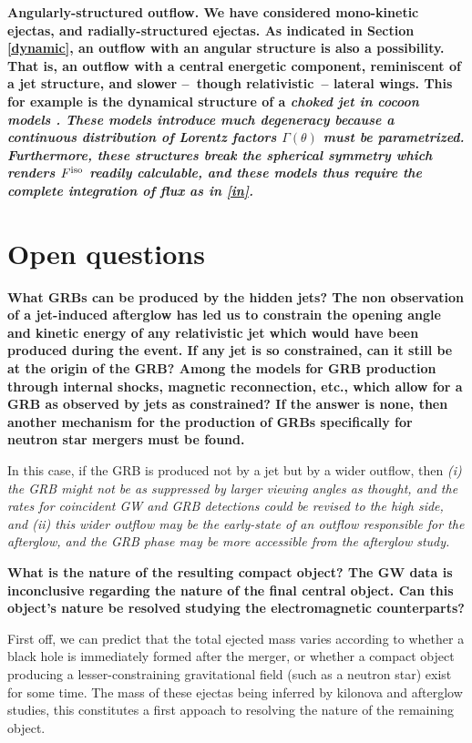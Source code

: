 \bf{Angularly-structured outflow.} We have considered mono-kinetic ejectas, and radially-structured ejectas. As indicated in Section  \ref{dynamic}, an outflow with an angular structure is also a possibility. That is, an outflow with a central energetic component, reminiscent of a jet structure, and slower --~though relativistic~-- lateral wings. This for example is the dynamical structure of a \it{choked jet} in cocoon models \cite{42, 5}. These models introduce much degeneracy because a continuous distribution of Lorentz factors $\Gamma(\theta)$ must be parametrized. Furthermore, these structures break the spherical symmetry which renders $F^{\rm{iso}}$ readily calculable, and these models thus require the complete integration of flux as in \ref{in}.

\section{Open questions}

\bf{What GRBs can be produced by the hidden jets? }The non observation of a jet-induced afterglow has led us to constrain the opening angle and kinetic energy of any relativistic jet which would have been produced during the event. If any jet is so constrained, can it still be at the origin of the GRB? Among the models for GRB production through internal shocks, magnetic reconnection, etc., which allow for a GRB as observed by jets as constrained? If the answer is none, then another mechanism for the production of GRBs specifically for neutron star mergers must be found.

In this case, if the GRB is produced not by a jet but by a wider outflow, then \it{(i)} the GRB might not be as suppressed by larger viewing angles as thought, and the rates for coincident GW and GRB detections could be revised to the high side, and \it{(ii)} this wider outflow may be the early-state of an outflow responsible for the afterglow, and the GRB phase may be more accessible from the afterglow study.

\bf{What is the nature of the resulting compact object? }The GW data is inconclusive regarding the nature of the final central object. Can this object's nature be resolved studying the electromagnetic counterparts?

First off, we can predict that the total ejected mass varies according to whether a black hole is immediately formed after the merger, or whether a compact object producing a lesser-constraining gravitational field (such as a neutron star) exist for some time. The mass of these ejectas being inferred by kilonova and afterglow studies, this constitutes a first appoach to resolving the nature of the remaining object.

